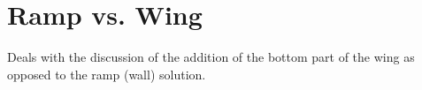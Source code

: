 \section{Ramp vs. Wing}
Deals with the discussion of the addition of the bottom part of the wing as opposed to the ramp (wall) solution.
